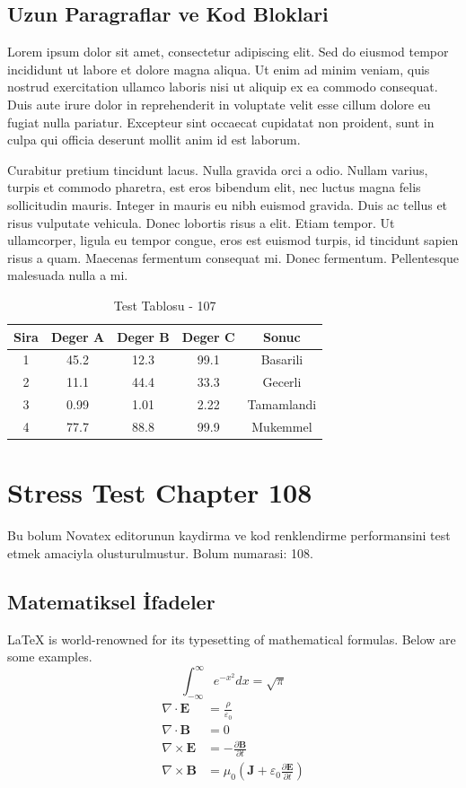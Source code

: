 \documentclass[12pt,a4paper]{article}
\begin{document}
\subsection{Uzun Paragraflar ve Kod Bloklari}
Lorem ipsum dolor sit amet, consectetur adipiscing elit. Sed do eiusmod tempor incididunt ut labore et dolore magna aliqua. Ut enim ad minim veniam, quis nostrud exercitation ullamco laboris nisi ut aliquip ex ea commodo consequat. Duis aute irure dolor in reprehenderit in voluptate velit esse cillum dolore eu fugiat nulla pariatur. Excepteur sint occaecat cupidatat non proident, sunt in culpa qui officia deserunt mollit anim id est laborum.

Curabitur pretium tincidunt lacus. Nulla gravida orci a odio. Nullam varius, turpis et commodo pharetra, est eros bibendum elit, nec luctus magna felis sollicitudin mauris. Integer in mauris eu nibh euismod gravida. Duis ac tellus et risus vulputate vehicula. Donec lobortis risus a elit. Etiam tempor. Ut ullamcorper, ligula eu tempor congue, eros est euismod turpis, id tincidunt sapien risus a quam. Maecenas fermentum consequat mi. Donec fermentum. Pellentesque malesuada nulla a mi.

\begin{table}[h!]
\centering
\begin{tabular}{|c|c|c|c|c|}
\hline
\textbf{Sira} & \textbf{Deger A} & \textbf{Deger B} & \textbf{Deger C} & \textbf{Sonuc} \\
\hline
1 & 45.2 & 12.3 & 99.1 & Basarili \\
2 & 11.1 & 44.4 & 33.3 & Gecerli \\
3 & 0.99 & 1.01 & 2.22 & Tamamlandi \\
4 & 77.7 & 88.8 & 99.9 & Mukemmel \\
\hline
\end{tabular}
\caption{Test Tablosu - 107}
\end{table}

\newpage
\section{Stress Test Chapter 108}
Bu bolum Novatex editorunun kaydirma ve kod renklendirme performansini test etmek amaciyla olusturulmustur. Bolum numarasi: 108.

\subsection{Matematiksel İfadeler}
\LaTeX{} is world-renowned for its typesetting of mathematical formulas. Below are some examples.
\begin{equation}
\int_{-\infty}^{\infty} e^{-x^2} dx = \sqrt{\pi}
\end{equation}
\begin{align}
\nabla \cdot \mathbf{E} &= \frac{\rho}{\varepsilon_0} \\
\nabla \cdot \mathbf{B} &= 0 \\
\nabla \times \mathbf{E} &= -\frac{\partial \mathbf{B}}{\partial t} \\
\nabla \times \mathbf{B} &= \mu_0\left(\mathbf{J} + \varepsilon_0 \frac{\partial \mathbf{E}}{\partial t}\right)
\end{align}
\end{document}
